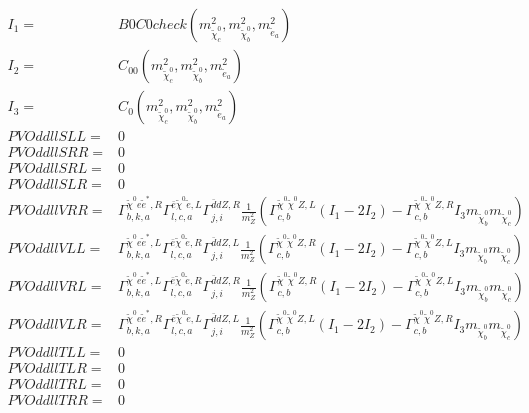 \documentclass[A4,landscape]{article}
\begin{document}
\begin{align} 
I_1= & B0C0check(m^2_{\tilde{\chi}^0_{{c}}}, m^2_{\tilde{\chi}^0_{{b}}}, m^2_{\tilde{e}_{{a}}}) \\ 
I_2= & C_{00}(m^2_{\tilde{\chi}^0_{{c}}}, m^2_{\tilde{\chi}^0_{{b}}}, m^2_{\tilde{e}_{{a}}}) \\ 
I_3= & C_0(m^2_{\tilde{\chi}^0_{{c}}}, m^2_{\tilde{\chi}^0_{{b}}}, m^2_{\tilde{e}_{{a}}}) \\ 
  PVOddllSLL= & 0 \\ 
  PVOddllSRR= & 0 \\ 
  PVOddllSRL= & 0 \\ 
  PVOddllSLR= & 0 \\ 
  PVOddllVRR= &  \Gamma^{\tilde{\chi}^0 e \tilde{e}^*,R}_{b, k, a} \Gamma^{\bar{e}\tilde{\chi}^0 \tilde{e} ,L}_{l, c, a} \Gamma^{\bar{d}d Z ,R}_{j, i} \frac{1}{m^2_{Z}} (\Gamma^{\tilde{\chi}^0 \tilde{\chi}^0 Z ,L}_{c, b} (I_1 - 2 I_2) - \Gamma^{\tilde{\chi}^0 \tilde{\chi}^0 Z ,R}_{c, b} I_3 m_{\tilde{\chi}^0_{{b}}} m_{\tilde{\chi}^0_{{c}}}) \\ 
  PVOddllVLL= &  \Gamma^{\tilde{\chi}^0 e \tilde{e}^*,L}_{b, k, a} \Gamma^{\bar{e}\tilde{\chi}^0 \tilde{e} ,R}_{l, c, a} \Gamma^{\bar{d}d Z ,L}_{j, i} \frac{1}{m^2_{Z}} (\Gamma^{\tilde{\chi}^0 \tilde{\chi}^0 Z ,R}_{c, b} (I_1 - 2 I_2) - \Gamma^{\tilde{\chi}^0 \tilde{\chi}^0 Z ,L}_{c, b} I_3 m_{\tilde{\chi}^0_{{b}}} m_{\tilde{\chi}^0_{{c}}}) \\ 
  PVOddllVRL= &  \Gamma^{\tilde{\chi}^0 e \tilde{e}^*,L}_{b, k, a} \Gamma^{\bar{e}\tilde{\chi}^0 \tilde{e} ,R}_{l, c, a} \Gamma^{\bar{d}d Z ,R}_{j, i} \frac{1}{m^2_{Z}} (\Gamma^{\tilde{\chi}^0 \tilde{\chi}^0 Z ,R}_{c, b} (I_1 - 2 I_2) - \Gamma^{\tilde{\chi}^0 \tilde{\chi}^0 Z ,L}_{c, b} I_3 m_{\tilde{\chi}^0_{{b}}} m_{\tilde{\chi}^0_{{c}}}) \\ 
  PVOddllVLR= &  \Gamma^{\tilde{\chi}^0 e \tilde{e}^*,R}_{b, k, a} \Gamma^{\bar{e}\tilde{\chi}^0 \tilde{e} ,L}_{l, c, a} \Gamma^{\bar{d}d Z ,L}_{j, i} \frac{1}{m^2_{Z}} (\Gamma^{\tilde{\chi}^0 \tilde{\chi}^0 Z ,L}_{c, b} (I_1 - 2 I_2) - \Gamma^{\tilde{\chi}^0 \tilde{\chi}^0 Z ,R}_{c, b} I_3 m_{\tilde{\chi}^0_{{b}}} m_{\tilde{\chi}^0_{{c}}}) \\ 
  PVOddllTLL= & 0 \\ 
  PVOddllTLR= & 0 \\ 
  PVOddllTRL= & 0 \\ 
  PVOddllTRR= & 0 \\ 
\end{align} 
\end{document}
